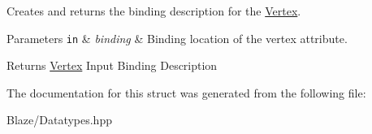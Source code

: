 Creates and returns the binding description for the \hyperlink{structblaze_1_1Vertex}{Vertex}. 


\begin{DoxyParams}[1]{Parameters}
\mbox{\tt in}  & {\em binding} & Binding location of the vertex attribute.\\
\hline
\end{DoxyParams}
\begin{DoxyReturn}{Returns}
\hyperlink{structblaze_1_1Vertex}{Vertex} Input Binding Description 
\end{DoxyReturn}


The documentation for this struct was generated from the following file\+:\begin{DoxyCompactItemize}
\item 
Blaze/Datatypes.\+hpp\end{DoxyCompactItemize}
